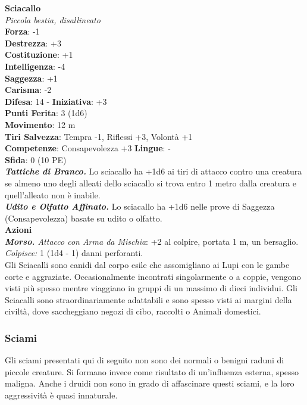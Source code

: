 \begin{multicols}{2}
\medskip\textbf{Sciacallo}\\
\emph{Piccola bestia, disallineato}\\
\textbf{Forza}: -1\\
\textbf{Destrezza}: +3\\
\textbf{Costituzione}: +1\\
\textbf{Intelligenza}: -4\\
\textbf{Saggezza}: +1\\
\textbf{Carisma}: -2\\
\textbf{Difesa}: 14 - \textbf{Iniziativa}: +3\\
\textbf{Punti Ferita}: 3 (1d6)\\
\textbf{Movimento}: 12 m\\
\textbf{Tiri Salvezza}: Tempra -1, Riflessi +3, Volontà +1\\
\textbf{Competenze}: Consapevolezza +3
\textbf{Lingue}: -\\
\textbf{Sfida}: 0 (10 PE)\smallskip\\
\emph{\textbf{Tattiche di Branco.}} Lo sciacallo ha +1d6 ai tiri di attacco contro una creatura se almeno uno degli alleati dello sciacallo si trova entro 1 metro dalla creatura e quell'alleato non è inabile.\\
\emph{\textbf{Udito e Olfatto Affinato.}} Lo sciacallo ha +1d6 nelle prove di Saggezza (Consapevolezza) basate su udito o olfatto.\\
\smallskip\textbf{Azioni}\\
\emph{\textbf{Morso.} Attacco con Arma da Mischia}: +2 al colpire, portata 1 m, un bersaglio.\\
\emph{Colpisce:} 1 (1d4 - 1) danni perforanti.\\
Gli Sciacalli sono canidi dal corpo esile che assomigliano ai Lupi con le gambe corte e aggraziate. Occasionalmente incontrati singolarmente o a coppie, vengono visti più spesso mentre viaggiano in gruppi di un massimo di dieci individui. Gli Sciacalli sono straordinariamente adattabili e sono spesso visti ai margini della civiltà, dove saccheggiano negozi di cibo, raccolti o Animali domestici.\\

\subsubsection{Sciami}

Gli sciami presentati qui di seguito non sono dei normali o benigni raduni di piccole creature. Si formano invece come risultato di un'influenza esterna, spesso maligna. Anche i druidi non sono in grado di affascinare questi sciami, e la loro aggressività è quasi innaturale.\\


\end{multicols}

